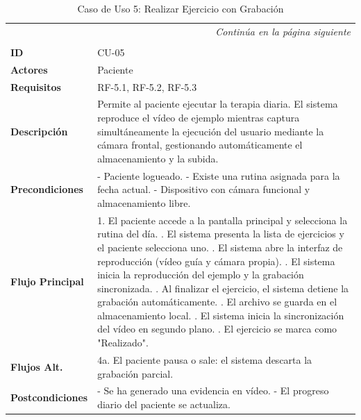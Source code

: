 \clearpage
\begin{longtable}{p{} p{}}
    \toprule
    \endfirsthead
    \toprule
    \endhead
    \midrule
    \multicolumn{2}{r}{\small\itshape Continúa en la página siguiente} \\
    \endfoot
    \bottomrule
    \noalign{\vspace{0.5cm}}
    \caption{Caso de Uso 5: Realizar Ejercicio con Grabación} \label{cu:5} \\
    \endlastfoot

    \textbf{ID} & CU-05 \\ \midrule
    \textbf{Actores} & Paciente \\ \midrule
    \textbf{Requisitos} & RF-5.1, RF-5.2, RF-5.3 \\ \midrule
    \textbf{Descripción} & Permite al paciente ejecutar la terapia diaria. El sistema reproduce el vídeo de ejemplo mientras captura simultáneamente la ejecución del usuario mediante la cámara frontal, gestionando automáticamente el almacenamiento y la subida. \\ \midrule
    \textbf{Precondiciones} & 
    - Paciente logueado. \newline
    - Existe una rutina asignada para la fecha actual. \newline
    - Dispositivo con cámara funcional y almacenamiento libre. \\ \midrule
    \textbf{Flujo Principal} & 
    1. El paciente accede a la pantalla principal y selecciona la rutina del día. \newline
    2. El sistema presenta la lista de ejercicios y el paciente selecciona uno. \newline
    3. El sistema abre la interfaz de reproducción (vídeo guía y cámara propia). \newline
    4. El sistema inicia la reproducción del ejemplo y la grabación sincronizada. \newline
    5. Al finalizar el ejercicio, el sistema detiene la grabación automáticamente. \newline
    6. El archivo se guarda en el almacenamiento local. \newline
    7. El sistema inicia la sincronización del vídeo en segundo plano. \newline
    8. El ejercicio se marca como "Realizado". \\ \midrule
    \textbf{Flujos Alt.} & 
    4a. El paciente pausa o sale: el sistema descarta la grabación parcial. \\ \midrule
    \textbf{Postcondiciones} & 
    - Se ha generado una evidencia en vídeo. \newline
    - El progreso diario del paciente se actualiza. \\
\end{longtable}


